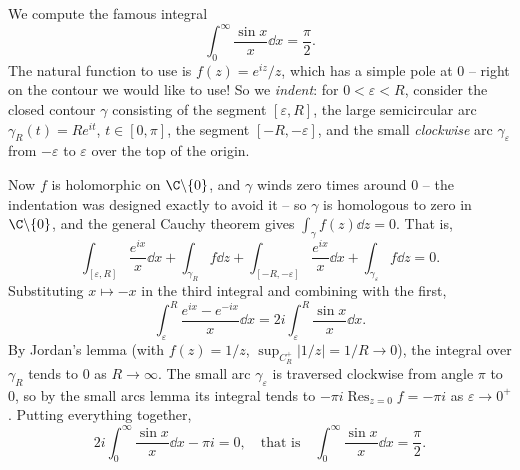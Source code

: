 \begin{example}
    We compute the famous integral
    $$
    \int_0^{\infty} \frac{\sin x}{x} \dd x = \frac{\pi}{2}.
    $$
    The natural function to use is $f(z) = e^{iz}/z$, which has a simple pole at $0$ -- right on the contour we would like to use! So we \emph{indent}: for $0 < \varepsilon < R$, consider the closed contour $\gamma$ consisting of the segment $[\varepsilon, R]$, the large semicircular arc $\gamma_R(t) = Re^{it}$, $t \in [0, \pi]$, the segment $[-R, -\varepsilon]$, and the small \emph{clockwise} arc $\gamma_\varepsilon$ from $-\varepsilon$ to $\varepsilon$ over the top of the origin.

    \begin{center}
    \end{center}

    Now $f$ is holomorphic on $\C \backslash \{0\}$, and $\gamma$ winds zero times around $0$ -- the indentation was designed exactly to avoid it -- so $\gamma$ is homologous to zero in $\C \backslash \{0\}$, and the general Cauchy theorem gives $\int_\gamma f(z) \dd z = 0$. That is,
    $$
    \int_{[\varepsilon, R]} \frac{e^{ix}}{x} \dd x + \int_{\gamma_R} f \dd z + \int_{[-R, -\varepsilon]} \frac{e^{ix}}{x} \dd x + \int_{\gamma_\varepsilon} f \dd z = 0.
    $$
    Substituting $x \mapsto -x$ in the third integral and combining with the first,
    $$
    \int_\varepsilon^R \frac{e^{ix} - e^{-ix}}{x} \dd x = 2i \int_\varepsilon^R \frac{\sin x}{x} \dd x.
    $$
    By Jordan's lemma (with $f(z) = 1/z$, $\sup_{C_R^+}|1/z| = 1/R \rightarrow 0$), the integral over $\gamma_R$ tends to $0$ as $R \rightarrow \infty$. The small arc $\gamma_\varepsilon$ is traversed clockwise from angle $\pi$ to $0$, so by the small arcs lemma its integral tends to $-\pi i \operatorname{Res}_{z = 0} f = -\pi i$ as $\varepsilon \rightarrow 0^+$. Putting everything together,
    $$
    2i\int_0^{\infty} \frac{\sin x}{x} \dd x - \pi i = 0, \quad \text{that is} \quad \int_0^\infty \frac{\sin x}{x} \dd x = \frac{\pi}{2}.
    $$
\end{example}

